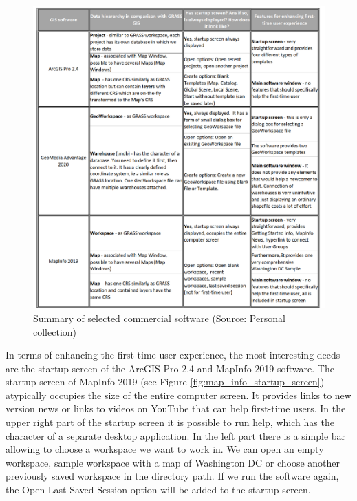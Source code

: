 \documentclass[a4paper,10pt,twoside]{article}
\begin{document}
\vspace{0.3cm}
\begin{figure}[hbt!] 
\begin{center}
\includegraphics[width=16.5cm]{../pictures/commercial_software.png}
\caption[Summary of selected commercial software]{Summary of selected commercial software (Source: Personal collection)}
\label{fig:commercial_software}
\end{center}
\end{figure}

\noindent In terms of enhancing the first-time user experience, the most interesting deeds are the startup screen of the ArcGIS Pro 2.4 and MapInfo 2019 software. The startup screen of MapInfo 2019 (see Figure \ref{fig:map_info_startup_screen}) atypically occupies the size of the entire computer screen. It provides links to new version news or links to videos on YouTube that can help first-time users. In the upper right part of the startup screen it is possible to run help, which has the character of a separate desktop application. In the left part there is a simple bar allowing to choose a workspace we want to work in. We can open an empty workspace, sample workspace with a map of Washington DC or choose another previously saved workspace in the directory path. If we run the software again, the Open Last Saved Session option will be added to the startup screen.
\end{document}
